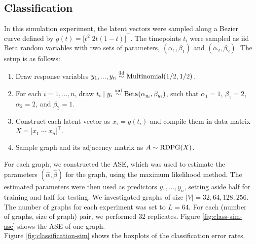 \documentclass[12pt]{article}
\providecommand{\tightlist}{%
  \setlength{\itemsep}{0pt}\setlength{\parskip}{0pt}}
\begin{document}
\subsection{Classification}\label{classification}

In this simulation experiment, the latent vectors were sampled along a
Bezier curve defined by \(g(t) = \bigl[ t^2 \; 2 t (1-t) \bigr]^\top\).
The timepoints \(t_i\) were sampled as iid Beta random variables with
two sets of parameters, \((\alpha_1, \beta_1)\) and
\((\alpha_2, \beta_2)\). The setup is as follows:

\begin{enumerate}
\def\labelenumi{\arabic{enumi}.}
\tightlist
\item
  Draw response variables \(y_1, ..., y_n \stackrel{\mathrm{iid}}{\sim} \mathrm{Multinomial}(1/2, 1/2)\).
\item
  For each \(i = 1, ..., n\), draw
  \(t_i \mid y_i \stackrel{\mathrm{ind}}{\sim} \mathrm{Beta}(\alpha_{y_i}, \beta_{y_i})\), such
  that \(\alpha_1 = 1\), \(\beta_1 = 2\), \(\alpha_2 = 2\), and
  \(\beta_2 = 1\).
\item
  Construct each latent vector as \(x_i = g(t_i)\) and compile them in
  data matrix \(X = \bigl[ x_1 \; \cdots \; x_n \bigr]^\top\).
\item
  Sample graph and its adjacency matrix as \(A \sim \mathrm{RDPG}(X)\).
\end{enumerate}

For each graph, we constructed the ASE, which was used to estimate the
parameters \((\hat{\alpha}, \hat{\beta})\) for the graph, using the
maximum likelihood method. The estimated parameters were then used as
predictors \(y_1, ..., y_n\), setting aside half for training and half
for testing. We investigated graphs of size \(|V| = 32, 64, 128, 256\).
The number of graphs for each experiment was set to \(L = 64\). For each
(number of graphs, size of graph) pair, we performed 32 replicates.
Figure \ref{fig:class-sim-ase} shows the ASE of one graph.\\
Figure \ref{fig:classification-sim} shows the boxplots of the
classification error rates.
\end{document}
